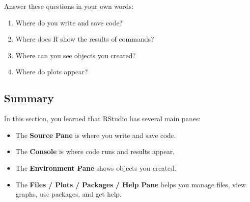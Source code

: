 \documentclass[
  letterpaper,
  DIV=11,
  numbers=noendperiod]{scrartcl}
\providecommand{\tightlist}{%
  \setlength{\itemsep}{0pt}\setlength{\parskip}{0pt}}
\begin{document}
Answer these questions in your own words:

\begin{enumerate}
\def\labelenumi{\arabic{enumi}.}
\tightlist
\item
  Where do you write and save code?
\item
  Where does R show the results of commands?
\item
  Where can you see objects you created?
\item
  Where do plots appear?
\end{enumerate}

\subsection{Summary}\label{summary}

In this section, you learned that RStudio has several main panes:

\begin{itemize}
\tightlist
\item
  The \textbf{Source Pane} is where you write and save code.
\item
  The \textbf{Console} is where code runs and results appear.
\item
  The \textbf{Environment Pane} shows objects you created.
\item
  The \textbf{Files / Plots / Packages / Help Pane} helps you manage
  files, view graphs, use packages, and get help.
\end{itemize}
\end{document}
